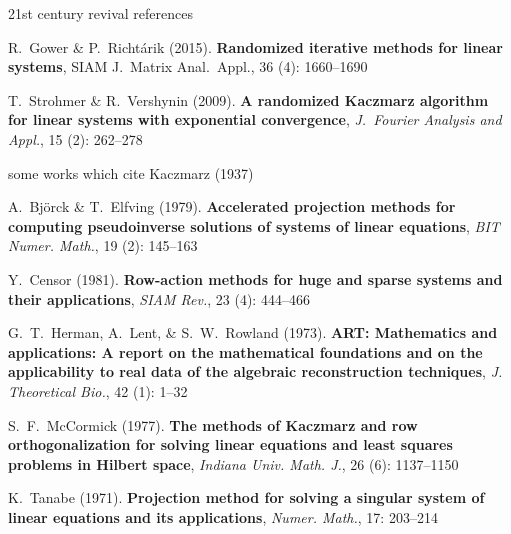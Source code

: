 \documentclass[usepdftitle=false,usenames,dvipsnames]{beamer}
\begin{document}
\begin{frame}{21st century revival references}

\begin{thebibliography}{1}

  R.~Gower \& P.~Richt\'arik (2015).  \textbf{Randomized iterative methods for linear systems}, SIAM J.~Matrix Anal.~Appl., 36 (4): 1660--1690

  T.~Strohmer \& R.~Vershynin (2009). \textbf{A randomized Kaczmarz algorithm for linear systems with exponential convergence}, \emph{J.~Fourier Analysis and Appl.}, 15 (2): 262--278
\end{thebibliography}
\end{frame}


\begin{frame}{some works which cite Kaczmarz (1937)}

\begin{thebibliography}{1}
 {\footnotesize A.~Bj\"orck \& T.~Elfving (1979). \textbf{Accelerated projection methods for computing pseudoinverse solutions of systems of linear equations}, \emph{BIT Numer. Math.}, 19 (2): 145--163}

 {\footnotesize Y.~Censor (1981). \textbf{Row-action methods for huge and sparse systems and their applications}, \emph{SIAM Rev.}, 23 (4): 444--466}

 {\footnotesize G.~T.~Herman, A.~Lent, \& S.~W.~Rowland (1973). \textbf{ART: Mathematics and applications: A report on the mathematical foundations and on the applicability to real data of the algebraic reconstruction techniques}, \emph{J. Theoretical Bio.}, 42 (1): 1--32}

 {\footnotesize S.~F.~McCormick (1977). \textbf{The methods of Kaczmarz and row orthogonalization for solving linear equations and least squares problems in Hilbert space}, \emph{Indiana Univ. Math. J.}, 26 (6): 1137--1150}

 {\footnotesize K.~Tanabe (1971). \textbf{Projection method for solving a singular system of linear equations and its applications}, \emph{Numer. Math.}, 17: 203--214}
\end{thebibliography}
\end{frame}
\end{document}
